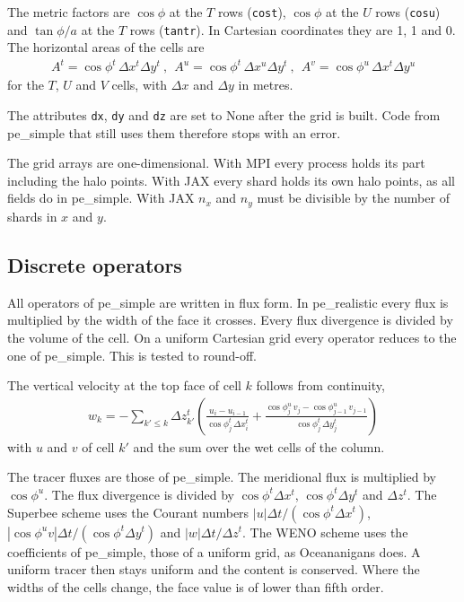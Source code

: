 \documentclass[12pt]{article}
\newcommand{\beq}  { \begin{eqnarray} }
\newcommand{\eeq}  { \end{eqnarray}}
\newcommand{\lk}{\left(}
\newcommand{\rk}{\right)}
\begin{document}
The metric factors are $\cos \phi$ at the $T$ rows (\verb|cost|), $\cos \phi$ at the $U$ rows (\verb|cosu|) and $\tan \phi/a$ at the $T$ rows (\verb|tantr|).
In Cartesian coordinates they are 1, 1 and 0.
The horizontal areas of the cells are
\beq
 A^t = \cos \phi^t\, \Delta x^t \Delta y^t ~,~~
 A^u = \cos \phi^t\, \Delta x^u \Delta y^t ~,~~
 A^v = \cos \phi^u\, \Delta x^t \Delta y^u
\eeq
for the $T$, $U$ and $V$ cells, with $\Delta x$ and $\Delta y$ in metres.

The attributes \verb|dx|, \verb|dy| and \verb|dz| are set to None after the grid is built.
Code from pe\_simple that still uses them therefore stops with an error.

The grid arrays are one-dimensional.
With MPI every process holds its part including the halo points.
With JAX every shard holds its own halo points, as all fields do in pe\_simple.
With JAX $n_x$ and $n_y$ must be divisible by the number of shards in $x$ and $y$.

\subsection*{Discrete operators}

All operators of pe\_simple are written in flux form.
In pe\_realistic every flux is multiplied by the width of the face it crosses.
Every flux divergence is divided by the volume of the cell.
On a uniform Cartesian grid every operator reduces to the one of pe\_simple.
This is tested to round-off.

The vertical velocity at the top face of cell $k$ follows from continuity,
\beq
 w_k = - \sum_{k' \le k} \Delta z^t_{k'} \lk
 \frac{u_i - u_{i-1}}{\cos \phi^t_j\, \Delta x^t_i}
 + \frac{\cos \phi^u_j\, v_j - \cos \phi^u_{j-1}\, v_{j-1}}{\cos \phi^t_j\, \Delta y^t_j} \rk
\eeq
with $u$ and $v$ of cell $k'$ and the sum over the wet cells of the column.

The tracer fluxes are those of pe\_simple.
The meridional flux is multiplied by $\cos \phi^u$.
The flux divergence is divided by $\cos \phi^t \Delta x^t$, $\cos \phi^t \Delta y^t$ and $\Delta z^t$.
The Superbee scheme uses the Courant numbers $|u| \Delta t /(\cos \phi^t \Delta x^t)$, $|\cos \phi^u v| \Delta t / (\cos \phi^t \Delta y^t)$ and $|w| \Delta t / \Delta z^t$.
The WENO scheme uses the coefficients of pe\_simple, those of a uniform grid, as Oceananigans does.
A uniform tracer then stays uniform and the content is conserved.
Where the widths of the cells change, the face value is of lower than fifth order.
\end{document}
